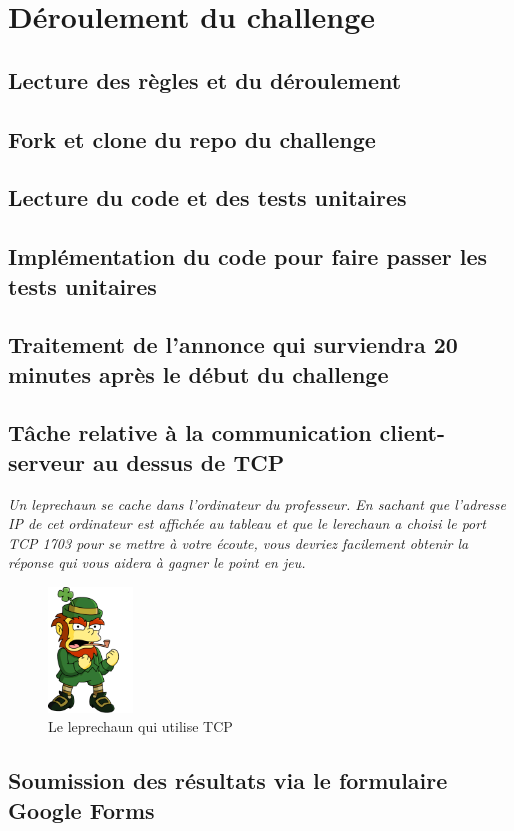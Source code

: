 \documentclass[a4paper, french, 10pt]{article} %
\begin{document}
\section{Déroulement du challenge}

\subsection{Lecture des règles et du déroulement}
\subsection{Fork et clone du repo du challenge}
\subsection{Lecture du code et des tests unitaires}
\subsection{Implémentation du code pour faire passer les tests unitaires}
\subsection{Traitement de l'annonce qui surviendra 20 minutes après le début du challenge}
\subsection{Tâche relative à la communication client-serveur au dessus de TCP}
\emph{Un leprechaun se cache dans l'ordinateur du professeur. En sachant que l'adresse IP de cet ordinateur est affichée au tableau et que le lerechaun a choisi le port TCP 1703 pour se mettre à votre écoute, vous devriez facilement obtenir la réponse qui vous aidera à gagner le point en jeu.}
\begin{figure}[h]
\centering
\includegraphics[width=0.2\textwidth]{leprechaun}
\caption{Le leprechaun qui utilise TCP}
\end{figure}
\subsection{Soumission des résultats via le formulaire Google Forms}
\end{document}
